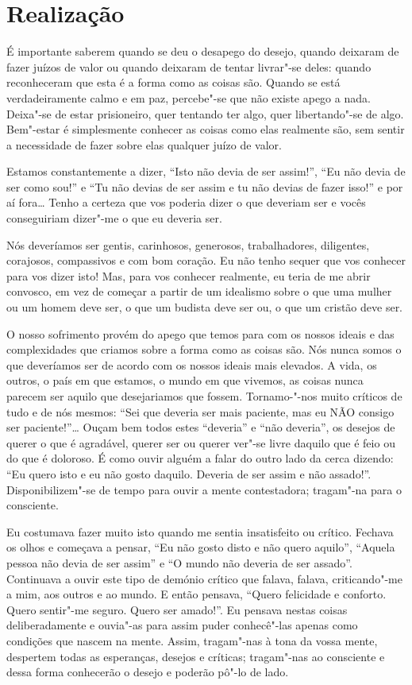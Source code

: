 \section{Realização}

É importante saberem quando se deu o desapego do desejo, quando deixaram de
fazer juízos de valor ou quando deixaram de tentar livrar"-se deles: quando
reconheceram que esta é a forma como as coisas são. Quando se está
verdadeiramente calmo e em paz, percebe"-se que não existe apego a nada. Deixa"-se
de estar prisioneiro, quer tentando ter algo, quer libertando"-se de algo.
Bem"-estar é simplesmente conhecer as coisas como elas realmente são, sem sentir
a necessidade de fazer sobre elas qualquer juízo de valor.

Estamos constantemente a dizer, “Isto não devia de ser assim!”, “Eu não devia de
ser como sou!” e “Tu não devias de ser assim e tu não devias de fazer isso!” e
por aí fora\ldots{} Tenho a certeza que vos poderia dizer o que deveriam ser e
vocês conseguiriam dizer"-me o que eu deveria ser.

Nós deveríamos ser gentis,
carinhosos, generosos, trabalhadores, diligentes, corajosos, compassivos e com
bom coração. Eu não tenho sequer que vos conhecer para vos dizer isto! Mas, para
vos conhecer realmente, eu teria de me abrir convosco, em vez de começar a
partir de um idealismo sobre o que uma mulher ou um homem deve ser, o que um
budista deve ser ou, o que um cristão deve ser.

O nosso sofrimento provém do apego que temos para com os nossos ideais e das
complexidades que criamos sobre a forma como as coisas são. Nós nunca somos o
que deveríamos ser de acordo com os nossos ideais mais elevados. A vida, os outros,
o país em que estamos, o mundo em que vivemos, as coisas nunca parecem ser
aquilo que desejariamos que fossem. Tornamo-"-nos muito críticos de tudo e de nós
mesmos: “Sei que deveria ser mais paciente, mas eu NÃO consigo ser
paciente!”\ldots{} Ouçam bem todos estes “deveria” e “não deveria”, os desejos
de querer o que é agradável, querer ser ou querer ver"-se livre daquilo que é
feio ou do que é doloroso. É como ouvir alguém a falar do outro lado da cerca
dizendo: “Eu quero isto e eu não gosto daquilo. Deveria de ser assim e não
assado!”. Disponibilizem"-se de tempo para ouvir a mente contestadora; tragam"-na
para o consciente.

Eu costumava fazer muito isto quando me sentia insatisfeito ou crítico. Fechava
os olhos e começava a pensar, “Eu não gosto disto e não quero aquilo”, “Aquela
pessoa não devia de ser assim” e “O mundo não deveria de ser assado”. Continuava
a ouvir este tipo de demónio crítico que falava, falava, criticando"-me a mim, aos
outros e ao mundo. E então pensava, “Quero felicidade e conforto. Quero
sentir"-me seguro. Quero ser amado!”. Eu pensava nestas coisas deliberadamente e
ouvia"-as para assim puder conhecê"-las apenas como condições que nascem na mente.
Assim, tragam"-nas à tona da vossa mente, despertem todas as esperanças,
desejos e críticas; tragam"-nas ao consciente e dessa forma conhecerão o desejo e
poderão pô"-lo de lado.

